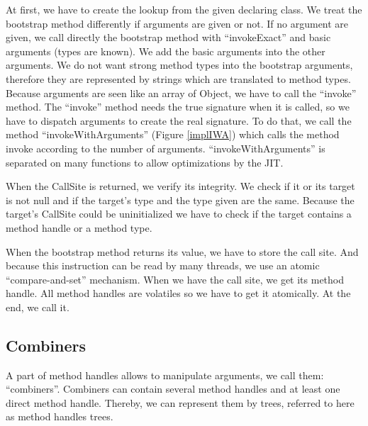 \documentclass{sig-alternate}
\begin{document}
      At first, we have to create the lookup from the given  declaring class.
      We treat the bootstrap method differently if arguments are given or not.
      If no argument are given, we call directly the bootstrap method
      with ``invokeExact'' and basic arguments (types are known).
      We add the basic arguments into the other arguments.
      We do not want strong method types into the bootstrap arguments,
      therefore they are represented by strings which are translated to method types.
      Because arguments are seen like an array of Object,
      we have to call the ``invoke'' method.
      The ``invoke'' method needs the true signature when it is called,
      so we have to dispatch arguments to create the real signature.
      To do that, we call the method ``invokeWithArguments'' (Figure \ref{implIWA})
      which calls the method invoke according to the number of arguments.
      ``invokeWithArguments'' is separated on many functions to allow optimizations by the JIT.


      When the CallSite is returned, we verify its integrity.
      We check if it or its target is not null and if the target's type and the type given are the same.
      Because the target's CallSite could be uninitialized we have to check if the target contains a method handle or a method type.

      When the bootstrap method returns its value, we have to store the call site.
      And because this instruction can be read by many threads, we use an atomic ``compare-and-set'' mechanism.
      When we have the call site, we get its method handle.
      All method handles are volatiles so we have to get it atomically.
      At the end, we call it.

    \subsection{Combiners}
    \label{combiners}

      A part of method handles allows to manipulate arguments, we call them: ``combiners''.
      Combiners can contain several method handles and at least one direct method handle.
      Thereby, we can represent them by trees, referred to here as method handles trees.
\end{document}
